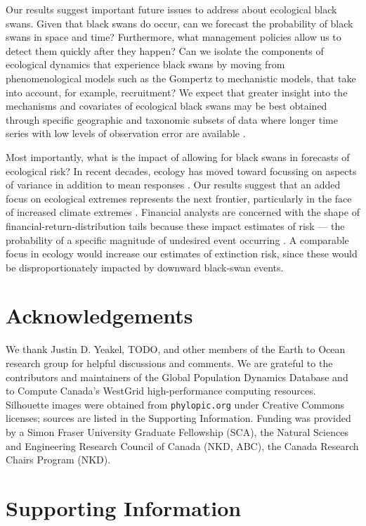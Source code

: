 Our results suggest important future issues to address about ecological black swans. Given that black swans do occur, can we forecast the probability of black swans in space and time? Furthermore, what management policies allow us to detect them quickly after they happen? Can we isolate the components of ecological dynamics that experience black swans by moving from phenomenological models such as the Gompertz to mechanistic models, that take into account, for example, recruitment? We expect that greater insight into the mechanisms and covariates of ecological black swans may be best obtained through specific geographic and taxonomic subsets of data where longer time series with low levels of observation error are available \citep[e.g.][]{segura2013}.

Most importantly, what is the impact of allowing for black swans in forecasts of ecological risk? In recent decades, ecology has moved toward focussing on aspects of variance in addition to mean responses \citep[e.g.][]{loreau2010a, thompson2013}. Our results suggest that an added focus on ecological extremes represents the next frontier, particularly in the face of increased climate extremes \citep{meehl2004,ipcc2012}. Financial analysts are concerned with the shape of financial-return-distribution tails because these impact estimates of risk --- the probability of a specific magnitude of undesired event occurring \citep{rachev2008}. A comparable focus in ecology would increase our estimates of extinction risk, since these would be disproportionately impacted by downward black-swan events.

\section{Acknowledgements}

We thank Justin D. Yeakel, TODO, and other members of the Earth to Ocean research group for helpful discussions and comments. We are grateful to the contributors and maintainers of the Global Population Dynamics Database and to Compute Canada's WestGrid high-performance computing resources. Silhouette images were obtained from \texttt{phylopic.org} under Creative Commons licenses; sources are listed in the Supporting Information. Funding was provided by a Simon Fraser University Graduate Fellowship (SCA), the Natural Sciences and Engineering Research Council of Canada (NKD, ABC), the Canada Research Chairs Program (NKD).

\section{Supporting Information}


